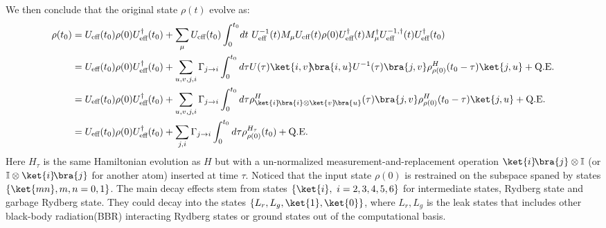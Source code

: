 \documentclass[11pt]{article}
\begin{document}
We then conclude that the original state $\rho(t)$ evolve as:
\begin{align*}
    \rho(t_0) &=  U_{\text{eff}}(t_0) \rho(0)  U^{\dagger}_{\text{eff}}(t_0) +\sum_{\mu}U_{\text{eff}}(t_0)  \int_0^{t_0} \!dt~U^{-1}_{\text{eff}}(t)  M_\mu U_{\text{eff}}(t)  \rho(0) U^{\dagger}_{\text{eff}}(t)  M_{\mu}^\dagger U_{\text{eff}}^{-1,\dagger}(t) U^{\dagger}_{\text{eff}}(t_0)   \\
     &=U_{\text{eff}}(t_0) \rho(0)  U^{\dagger}_{\text{eff}}(t_0) +\sum_{u,v,j,i} \Gamma_{j \to i} \int_0^{t_0} d\tau U(\tau) \ket{i,v}\!\!\bra{i,u}U^{-1}(\tau) \bra{j,v} \rho^H_{\rho(0)}(t_0 - \tau) \ket{j,u}  + \text{Q.E.}\\
    &= U_{\text{eff}}(t_0) \rho(0)  U^{\dagger}_{\text{eff}}(t_0) +\sum_{u,v,j,i} \Gamma_{j \to i} \int_0^{t_0} d\tau \rho_{\ket{i}\!\bra{i} \otimes \ket{v}\!\bra{u}}^H(\tau) \bra{j,v} \rho^H_{\rho(0)}(t_0 - \tau) \ket{j,u} + \text{Q.E.} \\
    &= U_{\text{eff}}(t_0) \rho(0)  U^{\dagger}_{\text{eff}}(t_0)+ \sum_{j,i} \Gamma_{j \to i} \int_0^{t_0} d\tau \rho_{\rho(0)}^{H_\tau}(t_0)  + \text{Q.E.}
\end{align*}
Here $H_\tau$ is the same Hamiltonian evolution as $H$ but with a un-normalized measurement-and-replacement operation $\ket{i}\!\bra{j} \otimes \mathbb{I}$ (or  $\mathbb{I}\otimes\ket{i}\!\bra{j}  $ for another atom) inserted at time $\tau$.
Noticed that the input state $\rho(0)$ is restrained on the subspace spaned by states $\{\ket{mn}, m,n = 0,1\}$. The main decay effects stem from states $\{\ket{i},~ i = 2,3,4,5,6\}$ for intermediate states, Rydberg state and garbage Rydberg state. They could decay into the states $\{L_r,L_g,\ket{1},\ket{0}\}$, where $L_r, L_g$ is the leak states that includes other black-body radiation(BBR) interacting Rydberg states or ground states out of the computational basis.
\end{document}
